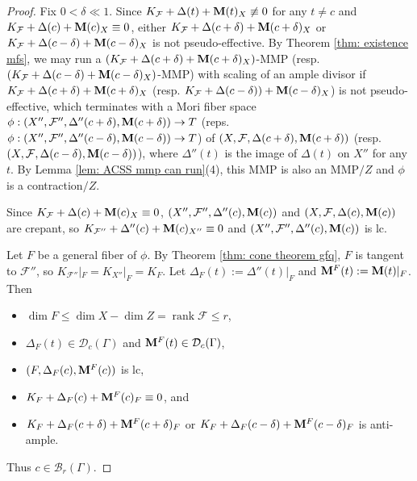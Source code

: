 \documentclass[11pt]{amsart}
\numberwithin{equation}{section}
\newcommand{\Mm}{{\bf{M}}}
\newcommand{\rk}{\operatorname{rank}}
\newcommand{\Ff}{\mathcal{F}}
\newcommand{\Ii}{\Gamma}
\theoremstyle{definition}
\theoremstyle{definition}
\theoremstyle{definition}
\begin{document}
\begin{proof}
Fix $0<\delta\ll 1$. Since $K_{\Ff}+\Delta(t)+\Mm(t)_X\not\equiv 0$ for any $t\not=c$ and $K_{\Ff}+\Delta(c)+\Mm(c)_X\equiv 0$, either $K_{\Ff}+\Delta(c+\delta)+\Mm(c+\delta)_X$ or $K_{\Ff}+\Delta(c-\delta)+\Mm(c-\delta)_X$ is not pseudo-effective. By Theorem \ref{thm: existence mfs}, we may run a $(K_{\Ff}+\Delta(c+\delta)+\Mm(c+\delta)_X)$-MMP (resp. $(K_{\Ff}+\Delta(c-\delta)+\Mm(c-\delta)_X)$-MMP) with scaling of an ample divisor if $K_{\Ff}+\Delta(c+\delta)+\Mm(c+\delta)_X$ (resp. $K_{\Ff}+\Delta(c-\delta))+\Mm(c-\delta)_X$) is not pseudo-effective, which terminates with a Mori fiber space $\phi: (X'',\Ff'',\Delta''(c+\delta),\Mm(c+\delta))\rightarrow T$ (reps. $\phi: (X'',\Ff'',\Delta''(c-\delta),\Mm(c-\delta))\rightarrow T$) of $(X,\Ff,\Delta(c+\delta),\Mm(c+\delta))$ (resp. $(X,\Ff,\Delta(c-\delta),\Mm(c-\delta))$), where $\Delta''(t)$ is the image of $\Delta(t)$ on $X''$ for any $t$. By Lemma \ref{lem: ACSS mmp can run}(4), this MMP is also an MMP$/Z$ and $\phi$ is a contraction$/Z$.

Since $K_{\Ff}+\Delta(c)+\Mm(c)_X\equiv 0$, $(X'',\Ff'',\Delta''(c),\Mm(c))$ and $(X,\Ff,\Delta(c),\Mm(c))$ are crepant, so $K_{\Ff''}+\Delta''(c)+\Mm(c)_{X''}\equiv 0$ and $(X'',\Ff'',\Delta''(c),\Mm(c))$ is lc.

Let $F$ be a general fiber of $\phi$. By Theorem \ref{thm: cone theorem gfq}, $F$ is tangent to $\Ff''$, so $K_{\Ff''}|_F=K_{X''}|_F=K_F$. Let $\Delta_{F}(t):=\Delta''(t)|_F$ and $\Mm^F(t):=\Mm(t)|_F$. Then
\begin{itemize}
   \item $\dim F\leq \dim X-\dim Z=\rk\Ff\leq r$,
    \item $\Delta_F(t)\in\mathcal{D}_c(\Ii)$ and $\Mm^F(t)\in\mathcal{D}_c(\Ii)$,
    \item $(F,\Delta_F(c),\Mm^F(c))$ is lc,
    \item $K_F+\Delta_F(c)+\Mm^F(c)_F\equiv 0$, and
    \item $K_F+\Delta_F(c+\delta)+\Mm^F(c+\delta)_F$ or $K_F+\Delta_F(c-\delta)+\Mm^F(c-\delta)_F$ is anti-ample.
\end{itemize}
Thus $c\in\mathcal{B}_r(\Ii)$.
\end{proof}
\end{document}
